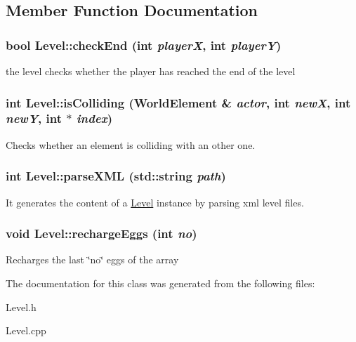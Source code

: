 \subsection{Member Function Documentation}
\hypertarget{classLevel_a02d8597c96961e7d27932fc686a5b94b}{
\subsubsection[{checkEnd}]{\setlength{\rightskip}{0pt plus 5cm}bool Level::checkEnd (int {\em playerX}, \/  int {\em playerY})}}
\label{classLevel_a02d8597c96961e7d27932fc686a5b94b}
the level checks whether the player has reached the end of the level \hypertarget{classLevel_a53dad6c67eae24dd703343894fd4a108}{
\subsubsection[{isColliding}]{\setlength{\rightskip}{0pt plus 5cm}int Level::isColliding ({\bf WorldElement} \& {\em actor}, \/  int {\em newX}, \/  int {\em newY}, \/  int $\ast$ {\em index})}}
\label{classLevel_a53dad6c67eae24dd703343894fd4a108}
Checks whether an element is colliding with an other one. \hypertarget{classLevel_add706d11e20076169ede9af12f4c58bc}{
\subsubsection[{parseXML}]{\setlength{\rightskip}{0pt plus 5cm}int Level::parseXML (std::string {\em path})}}
\label{classLevel_add706d11e20076169ede9af12f4c58bc}
It generates the content of a \hyperlink{classLevel}{Level} instance by parsing xml level files. \hypertarget{classLevel_af0aa91cdb9e52145003e7fcf8ed9ac25}{
\subsubsection[{rechargeEggs}]{\setlength{\rightskip}{0pt plus 5cm}void Level::rechargeEggs (int {\em no})}}
\label{classLevel_af0aa91cdb9e52145003e7fcf8ed9ac25}
Recharges the last \char`\"{}no\char`\"{} eggs of the array 

The documentation for this class was generated from the following files:\begin{DoxyCompactItemize}
\item 
Level.h\item 
Level.cpp\end{DoxyCompactItemize}
